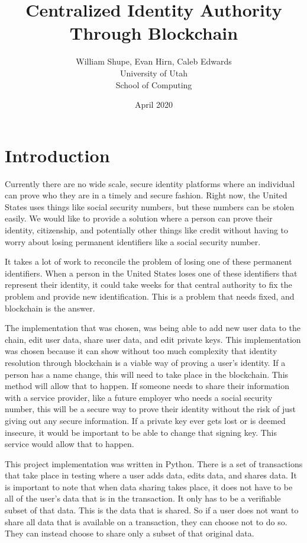 \documentclass[letterpaper, 10 pt, conference]{ieeeconf}  %
\title{Centralized Identity Authority Through Blockchain}
\author{William Shupe, Evan Hirn, Caleb Edwards \\ University of Utah \\ School of Computing}
\date{April 2020}
\begin{document}
\maketitle

\section{Introduction}

Currently there are no wide scale, secure identity platforms where an individual can prove who they are in a timely and secure fashion. Right now, the United States uses things like social security numbers, but these numbers can be stolen easily. We would like to provide a solution where a person can prove their identity, citizenship, and potentially
other things like credit without having to worry about losing permanent identifiers like a social security number.

It takes a lot of work to reconcile the problem of losing one of these permanent identifiers. When a person in the United States loses one of these identifiers that represent their identity, it could take weeks for that central authority to fix the problem and provide new identification. This is a problem that needs fixed, and blockchain is the answer.

The implementation that was chosen, was being able to add new user data to the chain, edit user data, share user data, and edit private keys. This implementation was chosen because it can show without too much complexity that identity resolution through blockchain is a viable way of proving a user's identity. If a person has a name change, this will need to take place in the blockchain. This method will allow that to happen. If someone needs to share their information with a service provider, like a future employer who needs a social security number, this will be a secure way to prove their identity without the risk of just giving out any secure information. If a private key ever gets lost or is deemed insecure, it would be important to be able to change that signing key. This service would allow that to happen. 

This project implementation was written in Python. There is a set of transactions that take place in testing where a user adds data, edits data, and shares data. It is important to note that when data sharing takes place, it does not have to be all of the user's data that is in the transaction. It only has to be a verifiable subset of that data. This is the data that is shared. So if a user does not want to share all data that is available on a transaction, they can choose not to do so. They can instead choose to share only a subset of that original data. 
\end{document}
